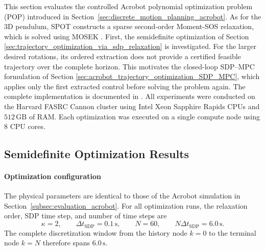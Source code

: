 This section evaluates the controlled Acrobot polynomial optimization problem
(POP) introduced in Section~\ref{sec:discrete_motion_planning_acrobot}. As for
the $3$D pendulum, SPOT constructs a sparse
second-order Moment-SOS relaxation, which is solved using MOSEK \cite{Kang_2025Global}. First, the
semidefinite optimization of
Section \ref{sec:trajectory_optimization_via_sdp_relaxation} is investigated.
For the larger desired rotations, its ordered extraction does not provide a
certified feasible trajectory over the complete horizon. This motivates the
closed-loop SDP--MPC formulation of
Section \ref{sec:acrobot_trajectory_optimization_SDP_MPC}, which applies only
the first extracted control before solving the problem again. The complete
implementation is documented in \cite{Elshani2026CTO_GitHub}. All experiments were conducted 
on the Harvard FASRC Cannon cluster using Intel Xeon Sapphire Rapids CPUs and 
\(512\,\mathrm{GB}\) of RAM. Each optimization was executed on a 
single compute node using 8 CPU cores.

\subsection{Semidefinite Optimization Results}
\label{subsec:acrobot_optimization_results}

\paragraph{Optimization configuration}
The physical parameters are identical to those of the Acrobot simulation in
Section~\ref{subsec:evaluation_acrobot}. For all optimization runs, the
relaxation order, SDP time step, and number of time steps are
\begin{equation}
    \kappa=2,
    \qquad
    \Delta t_{\mathrm{SDP}}=0.1\,\mathrm{s},
    \qquad
    N=60,
    \qquad
    N\Delta t_{\mathrm{SDP}}=6.0\,\mathrm{s}.
    \label{eq:acrobot_sdp_optimization_configuration}
\end{equation}
The complete discretization window from the history node $k=0$ to the terminal
node $k=N$ therefore spans $6.0\,\mathrm{s}$.

